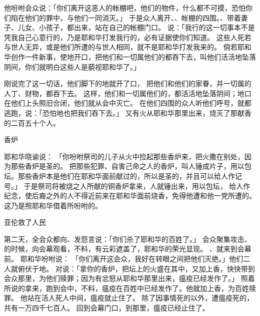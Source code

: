 {他吩咐会众说：「你们离开这恶人的帐棚吧，他们的物件，什么都不可摸，恐怕你们陷在他们的罪中，与他们一同消灭。」
于是众人离开{}、{}、{}帐棚的四围。{}、{}带着妻子、儿女、小孩子，都出来，站在自己的帐棚门口。
说：「我行的这一切事本不是凭我自己心意行的，乃是耶和华打发我行的，必有证据使你们知道。
这些人死若与世人无异，或是他们所遭的与世人相同，就不是耶和华打发我来的。
倘若耶和华创作一件新事，使地开口，把他们和一切属他们的都吞下去，叫他们活活地坠落阴间，你们就明白这些人是藐视耶和华了。」
\par }{\PP {}刚说完了这一切话，他们脚下的地就开了口，
把他们和他们的家眷，并一切属{}的人丁、财物，都吞下去。
这样，他们和一切属他们的，都活活地坠落阴间；地口在他们上头照旧合闭，他们就从会中灭亡。
在他们四围的{}众人听他们呼号，就都逃跑，说：「恐怕地也把我们吞下去。」
又有火从耶和华那里出来，烧灭了那献香的二百五十个人。
\par }{\SH 香炉
\par }{\PP {}耶和华晓谕{}说：
「你吩咐祭司{}的儿子{}从火中捡起那些香炉来，把火撒在别处，因为那些香炉是圣的。
把那些犯罪、自害己命之人的香炉，叫人锤成片子，用以包坛。那些香炉本是他们在耶和华面前献过的，所以是圣的，并且可以给{}人作记号。」
于是祭司{}将被烧之人所献的铜香炉拿来，人就锤出来，用以包坛，
给{}人作纪念，使{}后裔之外的人不得近前来在耶和华面前烧香，免得他遭{}和他一党所遭的。这乃是照耶和华借着{}所吩咐的。
\par }{\SH 亚伦救了人民
\par }{\PP {}第二天，{}全会众都向{}、{}发怨言说：「你们杀了耶和华的百姓了。」
会众聚集攻击{}、{}的时候，向会幕观看，不料，有云彩遮盖了，耶和华的荣光显现。
、{}就来到会幕前。
耶和华吩咐{}说：
「你们离开这会众，我好在转眼之间把他们灭绝。」他们二人就俯伏于地。
对{}说：「拿你的香炉，把坛上的火盛在其中，又加上香，快快带到会众那里，为他们赎罪；因为有忿怒从耶和华那里出来，瘟疫已经发作了。」
照着{}所说的拿来，跑到会中，不料，瘟疫在百姓中已经发作了。他就加上香，为百姓赎罪。
他站在活人死人中间，瘟疫就止住了。
除了因{}事情死的以外，遭瘟疫死的，共有一万四千七百人。
回到会幕门口，到{}那里，瘟疫已经止住了。

}
